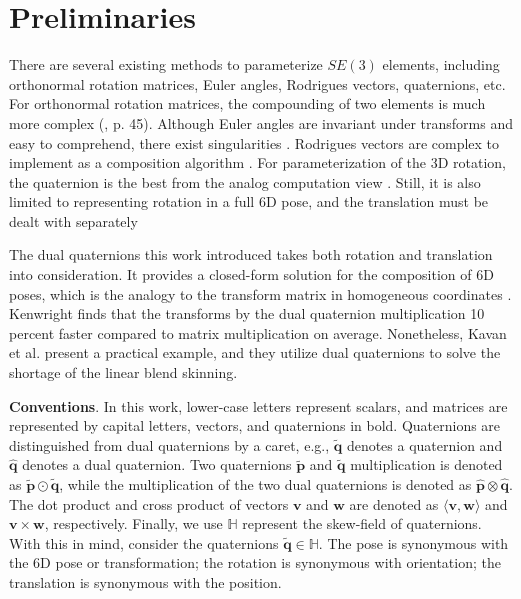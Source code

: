 \documentclass[micromachines,article,accept,pdftex,moreauthors]{Definitions/mdpi}
\begin{document}

\section{Preliminaries}\label{2}
There are several existing methods to parameterize $SE(3)$ elements, including orthonormal rotation matrices, Euler angles, Rodrigues vectors, quaternions, etc. For orthonormal rotation matrices, the compounding of two elements is much more complex (\cite{corkeRoboticsVisionControl2017}, {p. 45}). %
Although Euler angles are invariant under transforms and easy to comprehend, there exist singularities \cite{jacksonPlanningAttitude2021}. Rodrigues vectors are complex to implement as a composition algorithm \cite{feiten20096d}.  {For parameterization of the 3D rotation, the quaternion is the best from the analog computation view \cite{stuelpnagelParametrizationThreeDimensionalRotation1964}. Still, it is also limited to representing rotation in a full 6D pose, and the translation must be dealt with separately}

The dual quaternions this work introduced takes both rotation and translation into consideration. It provides a closed-form solution for the composition of 6D poses, which is the analogy to the transform matrix in homogeneous coordinates \cite{feitenRigidMotionEstimation2013}.  {Kenwright \cite{kenwrightBeginnersGuideDualquaternions2012} finds that the transforms by the dual quaternion multiplication 10 percent faster compared to matrix multiplication on average. Nonetheless, Kavan et al. \cite{kavanSkinningDualQuaternions2007} present a practical example, and they utilize dual quaternions to solve the shortage of the linear blend skinning.}

{\textbf{Conventions}.} %
In this work, lower-case letters represent scalars, and matrices are represented by capital letters, vectors, and quaternions in bold. Quaternions are distinguished from dual quaternions by a caret, e.g., $\widetilde{\boldsymbol{q}}$ denotes a quaternion and $\widehat{\boldsymbol{q}}$ denotes a dual quaternion. Two quaternions $\widetilde{\boldsymbol{p}}$ and $\widetilde{\boldsymbol{q}}$ multiplication is denoted as  $\widetilde{\boldsymbol{p}} \odot \widetilde{\boldsymbol{q}}$, while the multiplication of the two dual quaternions is denoted as $\widehat{\boldsymbol{p}} \otimes \widehat{\boldsymbol{q}}$. The dot product and cross product of vectors $\boldsymbol{v}$ and $\boldsymbol{w}$ are denoted as $\langle{\boldsymbol{v},\boldsymbol{w}}\rangle$ and $\boldsymbol{v} \times \boldsymbol{w}$, respectively. Finally, we use $\mathbb{H}$ represent the skew-field of quaternions. With this in mind, consider the quaternions $\widetilde{\boldsymbol{q}} \in \mathbb{H}$. {The pose is synonymous with the 6D pose or transformation; the rotation is synonymous with orientation; the translation is synonymous with the position.} %
\end{document}

